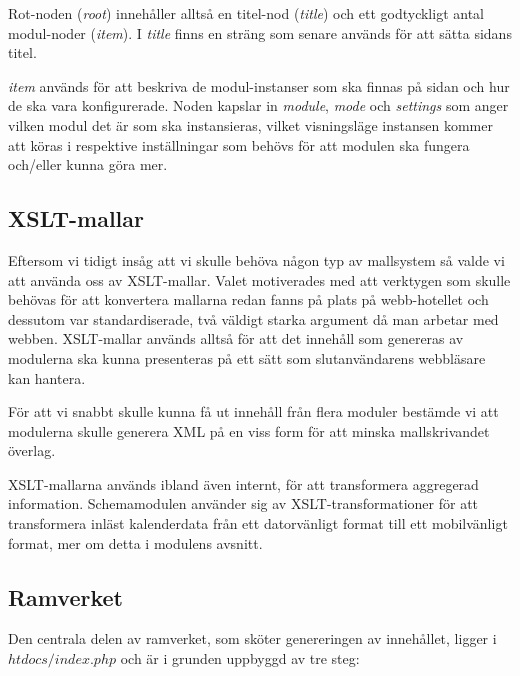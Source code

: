 Rot-noden ({\it root}) innehåller alltså en titel-nod ({\it title}) och ett
godtyckligt antal modul-noder ({\it item}). I {\it title} finns en sträng som
senare används för att sätta sidans titel.

{\it item} används för att beskriva de modul-instanser som ska finnas på sidan
och hur de ska vara konfigurerade. Noden kapslar in {\it module}, {\it mode} och
{\it settings} som anger vilken modul det är som ska instansieras, vilket
visningsläge instansen kommer att köras i respektive inställningar som behövs
för att modulen ska fungera och/eller kunna göra mer.

\subsection{XSLT-mallar}
Eftersom vi tidigt insåg att vi skulle behöva någon typ av mallsystem så valde
vi att använda oss av XSLT-mallar. Valet motiverades med att verktygen som
skulle behövas för att konvertera mallarna redan fanns på plats på webb-hotellet
och dessutom var standardiserade, två väldigt starka argument då man arbetar med
webben. XSLT-mallar används alltså för att det innehåll som genereras av
modulerna ska kunna presenteras på ett sätt som slutanvändarens webbläsare kan
hantera.

För att vi snabbt skulle kunna få ut innehåll från flera moduler bestämde vi att
modulerna skulle generera XML på en viss form för att minska mallskrivandet
överlag.

XSLT-mallarna används ibland även internt, för att transformera aggregerad
information. Schemamodulen använder sig av XSLT-transformationer för att
transformera inläst kalenderdata från ett datorvänligt format till ett
mobilvänligt format, mer om detta i modulens avsnitt.

\subsection{Ramverket}

Den centrala delen av ramverket, som sköter genereringen av innehållet, ligger
i $htdocs/index.php$ och är i grunden uppbyggd av tre steg:

